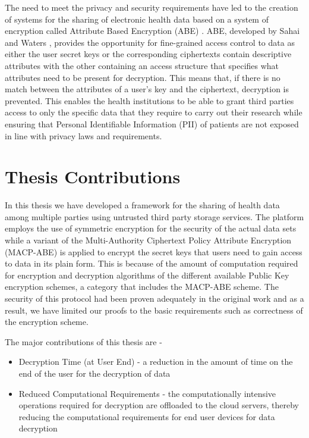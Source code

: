 The need to meet the privacy and security requirements have led to the creation of systems for the sharing of electronic health data based on a system of encryption called Attribute Based Encryption (ABE) \cite{Ibraimi2010}\cite{Narayan2010}\cite{Akinyele2010}\cite{Barua2011}\cite{Alshehri}\cite{Hupperich2012}\cite{Hsieh2012}\cite{Li2013}. ABE, developed by Sahai and Waters \cite{Sahai2005}, provides the opportunity for fine-grained access control to data as either the user secret keys or the corresponding ciphertexts contain descriptive attributes with the other containing an access structure that specifies what attributes need to be present for decryption. This means that, if there is no match between the attributes of a user's key and the ciphertext, decryption is prevented. This enables the health institutions to be able to grant third parties access to only the specific data that they require to carry out their research while ensuring that Personal Identifiable Information (PII) of patients are not exposed in line with privacy laws and requirements.


\section{Thesis Contributions}

In this thesis we have developed a framework for the sharing of health data among multiple parties using untrusted third party storage services. The platform employs the use of symmetric encryption for the security of the actual data sets while a variant of the Multi-Authority Ciphertext Policy Attribute Encryption (MACP-ABE) is applied to encrypt the secret keys that users need to gain access to data in its plain form. This is because of the amount of computation required for encryption and decryption algorithms of the different available Public Key encryption schemes, a category that includes the MACP-ABE scheme. The security of this protocol had been proven adequately in the original work \cite{Yang2014} and as a result, we have limited our proofs to the basic requirements such as correctness of the encryption scheme.

The major contributions of this thesis are - 

\begin{itemize}
	
	\item Decryption Time (at User End) - a reduction in the amount of time on the end of the user for the decryption of data
	
	\item Reduced Computational Requirements - the computationally intensive operations required for decryption are offloaded to the cloud servers, thereby reducing the computational requirements for end user devices for data decryption
	
\end{itemize}


